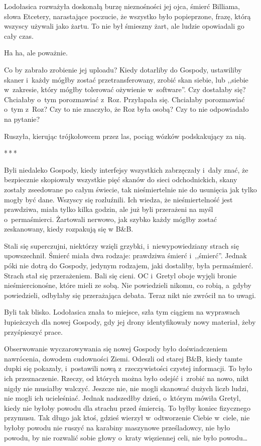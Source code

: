 \documentclass[oneside,polish,11pt,sfheadings]{mwbk}
\newcommand{\threeast}{\bigskip\par\centerline{*\,*\,*}\medskip\par}
\begin{document}
Lodołasica rozważyła doskonałą burzę nieznośności jej ojca, śmierć
Billiama, słowa Etcetery, narastające poczucie, że wszystko było
popieprzone, frazę, którą wszyscy używali jako żartu. To nie był
śmieszny żart, ale ludzie opowiadali go cały czas.

Ha ha, ale poważnie.

Co by zabrało zrobienie jej uploadu? Kiedy dotarliby do Gospody,
ustawiliby skaner i~każdy mógłby zostać przetransferowany, zrobić skan
siebie, lub ,,siebie w~zakresie, który mógłby tolerować ożywienie w~software''. Czy dostałaby się? Chciałaby o~tym porozmawiać z~Roz.
Przyłapała się. Chciałaby porozmawiać o~tym z~Roz? Czy to nie znaczyło,
że Roz była osobą? Czy to nie odpowiadało na pytanie?

Ruszyła, kierując trójkołowcem przez las, pociąg wózków podskakujący za
nią.

\threeast

Byli niedaleko Gospody, kiedy interfejsy wszystkich zabrzęczały i~dały
znać, że bezpiecznie skopiowały wszystkie pięć skanów do sieci
odchodnickich, skany zostały zseedowane po całym świecie, tak
nieśmiertelnie nie do usunięcia jak tylko mogły być dane. Wszyscy się
rozluźnili. Ich wiedza, że nieśmiertelność jest prawdziwa, miała tylko
kilka godzin, ale już byli przerażeni na myśl o~permaśmierci. Żartowali
nerwowo, jak szybko każdy mógłby zostać zeskanowany, kiedy rozpakują się
w B\&B.

Stali się superczujni, niektórzy wzięli grzybki, i~niewypowiedziany
strach się upowszechnił. Śmierć miała dwa rodzaje: prawdziwa śmierć i~,,śmierć''. Jednak póki nie dotrą do Gospody, jedynym rodzajem, jaki
dostaliby, była permaśmierć. Strach stał się przerażeniem. Bali się
cieni. OC i~Gretyl oboje wyjęli bronie nieśmiercionośne, które mieli ze
sobą. Nie powiedzieli nikomu, co robią, a~gdyby powiedzieli, odbyłaby
się przerażająca debata. Teraz nikt nie zwrócił na to uwagi.

Byli tak blisko. Lodołasica znała to miejsce, szła tym ciągiem na
wyprawach łupieżczych dla nowej Gospody, gdy jej drony identyfikowały
nowy materiał, żeby przyśpieszyć prace.

Obserwowanie wyczarowywania się nowej Gospody było doświadczeniem
nawrócenia, dowodem cudowności Ziemi. Odeszli od starej B\&B, kiedy
tamte dupki się pokazały, i~postawili nową z~rzeczywistości czystej
informacji. To było ich przeznaczenie. Rzeczy, od których można było
odejść i~zrobić na nowo, nikt nigdy nie musiałby walczyć. Jeszcze nie,
nie mogli skanować dużych liczb ludzi, nie mogli ich ucieleśniać. Jednak
nadszedłby dzień, o~którym mówiła Gretyl, kiedy nie byłoby powodu dla
strachu przed śmiercią. To byłby koniec fizycznego przymusu. Tak długo
jak ktoś, gdzieś wierzył w~odtworzenie Ciebie w~ciele, nie byłoby powodu
nie ruszyć na karabiny maszynowe prześladowcy, nie było powodu, by nie
rozwalić sobie głowy o~kraty więziennej celi, nie było powodu\ldots 
\end{document}
